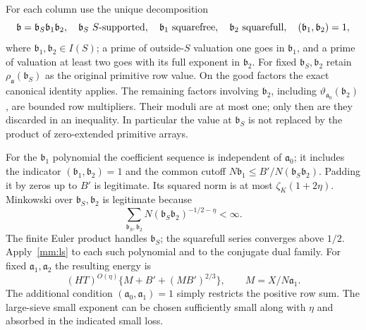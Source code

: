 \documentclass[11pt,oneside,openany]{book}
\theoremstyle{definition}\newtheorem{definition}[theorem]{Definition}
\theoremstyle{remark}\newtheorem{remark}[theorem]{Remark}
\begin{document}
For each column use the unique decomposition
\[
 \mathfrak b=\mathfrak b_S\mathfrak b_1\mathfrak b_2,
 \quad \mathfrak b_S\ S\hbox{-supported},\quad
 \mathfrak b_1\ \hbox{squarefree},\quad
 \mathfrak b_2\ \hbox{squarefull},\quad
 (\mathfrak b_1,\mathfrak b_2)=1,
\]
where $\mathfrak b_1,\mathfrak b_2\in I(S)$; a prime of outside-$S$
valuation one goes in $\mathfrak b_1$, and a prime of valuation at least
two goes with its full exponent in $\mathfrak b_2$. For fixed
$\mathfrak b_S,\mathfrak b_2$ retain
$\rho_{\mathfrak a}(\mathfrak b_S)$ as the original primitive row
value. On the good factors the exact canonical identity applies.
The remaining factors involving $\mathfrak b_2$, including
$\vartheta_{\mathfrak a_0}(\mathfrak b_2)$, are bounded row
multipliers. Their moduli are at most one; only then are they discarded
in an inequality. In particular the value at $\mathfrak b_S$ is not
replaced by the product of zero-extended primitive arrays.

For the $\mathfrak b_1$ polynomial the coefficient sequence is
independent of $\mathfrak a_0$; it includes the indicator
$(\mathfrak b_1,\mathfrak b_2)=1$ and the common cutoff
$N\mathfrak b_1\le B'/N(\mathfrak b_S\mathfrak b_2)$.
Padding it by zeros up to $B'$ is legitimate. Its squared norm is at most
$\zeta_K(1+2\eta)$. Minkowski over $\mathfrak b_S,\mathfrak b_2$
is legitimate because
\[
 \sum_{\mathfrak b_S,\mathfrak b_2}
       N(\mathfrak b_S\mathfrak b_2)^{-1/2-\eta}<\infty.
\]
The finite Euler product handles $\mathfrak b_S$; the squarefull series
converges above $1/2$. Apply~\eqref{mm:ls} to each such polynomial and
to the conjugate dual family. For fixed $\mathfrak a_1,\mathfrak a_2$
the resulting energy is
\begin{equation}\label{mm:block-energy}
 (HT)^{O(\eta)}\{M+B'+(MB')^{2/3}\},\qquad
 M=X/N\mathfrak a_1.
\end{equation}
The additional condition $(\mathfrak a_0,\mathfrak a_1)=1$ simply
restricts the positive row sum. The large-sieve small exponent can be
chosen sufficiently small along with $\eta$ and absorbed in the
indicated small loss.
\end{document}
